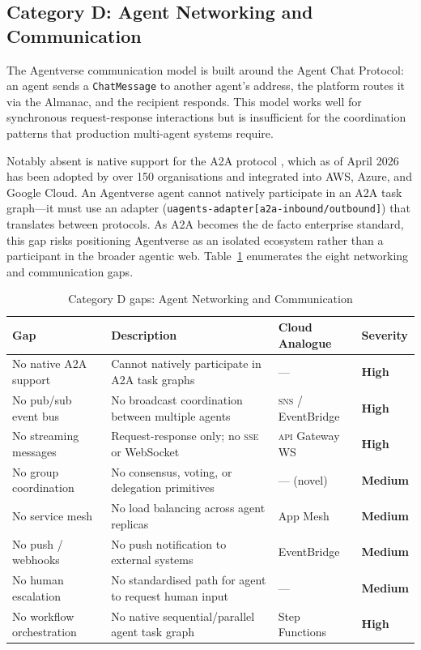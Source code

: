 \documentclass[twoside,11pt]{article}
\newcommand{\high}{\textcolor{red!70!black}{\textbf{High}}}
\newcommand{\medium}{\textcolor{orange!80!black}{\textbf{Medium}}}
\begin{document}
\subsection{Category D: Agent Networking and Communication}
\label{subsec:gap-networking}

The Agentverse communication model is built around the Agent Chat Protocol:
an agent sends a \texttt{ChatMessage} to another agent's address, the platform
routes it via the Almanac, and the recipient responds.  This model works well
for synchronous request-response interactions but is insufficient for the
coordination patterns that production multi-agent systems require.

Notably absent is native support for the A2A protocol \citep{a2a2026}, which
as of April 2026 has been adopted by over 150 organisations and integrated into
AWS, Azure, and Google Cloud.  An Agentverse agent cannot natively participate
in an A2A task graph---it must use an adapter
(\texttt{uagents-adapter[a2a-inbound/outbound]}) that translates between
protocols.  As A2A becomes the de facto enterprise standard, this gap risks
positioning Agentverse as an isolated ecosystem rather than a participant in
the broader agentic web.  Table~\ref{tab:gap-networking} enumerates the
eight networking and communication gaps.

\begin{table}[htbp]
\centering
\caption{Category D gaps: Agent Networking and Communication}
\label{tab:gap-networking}
\begin{tabular}{p{3.2cm} p{5.5cm} p{2.9cm} l}
\toprule
\textbf{Gap} & \textbf{Description} & \textbf{Cloud Analogue} &
\textbf{Severity} \\
\midrule
No native A2A support & Cannot natively participate in A2A task graphs & --- &
\high \\[4pt]
No pub/sub event bus & No broadcast coordination between multiple agents &
\textsc{sns} / EventBridge & \high \\[4pt]
No streaming messages & Request-response only; no \textsc{sse} or WebSocket &
\textsc{api} Gateway WS & \high \\[4pt]
No group coordination & No consensus, voting, or delegation primitives & ---
(novel) & \medium \\[4pt]
No service mesh & No load balancing across agent replicas & App Mesh &
\medium \\[4pt]
No push / webhooks & No push notification to external systems & EventBridge &
\medium \\[4pt]
No human escalation & No standardised path for agent to request human input &
--- & \medium \\[4pt]
No workflow orchestration & No native sequential/parallel agent task graph &
Step Functions & \high \\
\bottomrule
\end{tabular}
\end{table}
\end{document}
